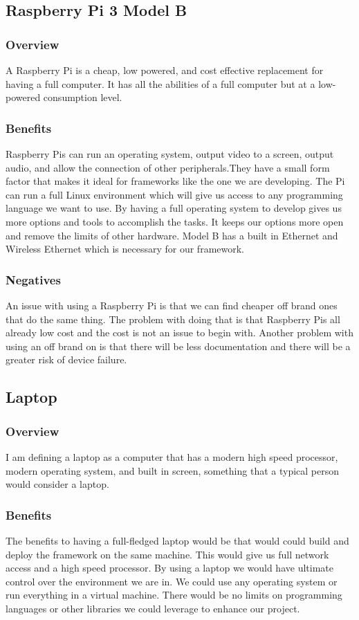 \subsection{Raspberry Pi 3 Model B}
\subsubsection{Overview}
A Raspberry Pi is a cheap, low powered, and cost effective replacement for having a full computer. It has all the abilities of a full computer but at a low-powered consumption level. \cite{rpi}
\subsubsection{Benefits}
Raspberry Pis can run an operating system, output video to a screen, output audio, and allow the connection of other peripherals.They have a small form factor that makes it ideal for frameworks like the one we are developing. The Pi can run a full Linux environment which will give us access to any programming language we want to use. By having a full operating system to develop gives us more options and tools to accomplish the tasks. It keeps our options more open and remove the limits of other hardware. Model B has a built in Ethernet and Wireless Ethernet which is necessary for our framework. \cite{rpi}
\subsubsection{Negatives}
An issue with using a Raspberry Pi is that we can find cheaper off brand ones that do the same thing. The problem with doing that is that Raspberry Pis all already low cost and the cost is not an issue to begin with. Another problem with using an off brand on is that there will be less documentation and there will be a greater risk of device failure.
\subsection{Laptop}
\subsubsection{Overview}
I am defining a laptop as a computer that has a modern high speed processor, modern operating system, and built in screen, something that a typical person would consider a laptop.

\subsubsection{Benefits}
The benefits to having a full-fledged laptop would be that would could build and deploy the framework on the same machine. This would give us full network access and a high speed processor. By using a laptop we would have ultimate control over the environment we are in. We could use any operating system or run everything in a virtual machine. There would be no limits on programming languages or other libraries we could leverage to enhance our project. 
